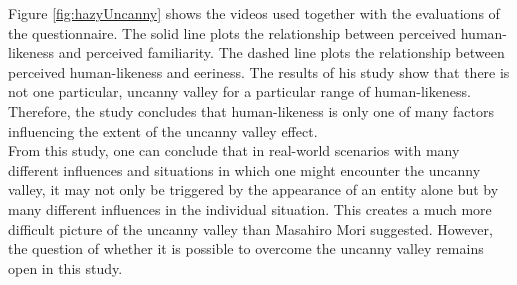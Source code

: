 Figure \ref{fig:hazyUncanny} shows the videos used together with the evaluations of the questionnaire. The solid line plots the relationship between perceived human-likeness and perceived familiarity. The dashed line plots the relationship between perceived human-likeness and eeriness. The results of his study show that there is not one particular, uncanny valley for a particular range of human-likeness. Therefore, the study concludes that human-likeness is only one of many factors influencing the extent of the uncanny valley effect.\\
From this study, one can conclude that in  real-world scenarios with many different influences and situations in which one might encounter the uncanny valley, it may not only be triggered by the appearance of an entity alone but by many different influences in the individual situation. This creates a much more difficult picture of the uncanny valley than Masahiro Mori suggested. However, the question of whether it is possible to overcome the uncanny valley remains open in this study.

